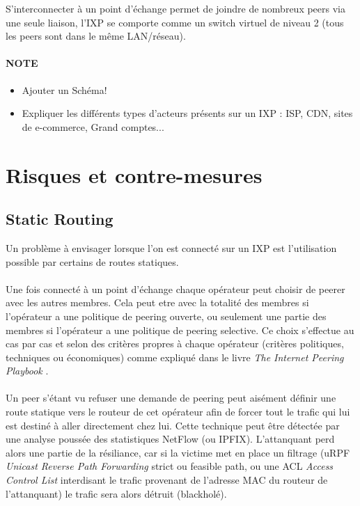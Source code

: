 S'interconnecter à un point d'échange permet de joindre de nombreux peers via une seule liaison, l'IXP se comporte comme un switch virtuel de niveau 2 (tous les peers sont dans le même LAN/réseau).

\paragraph{NOTE}
\begin{itemize}
\item Ajouter un Schéma!
\item Expliquer les différents types d'acteurs présents sur un IXP : ISP, CDN, sites de e-commerce, Grand comptes...
\end{itemize}

\section{Risques et contre-mesures}

\subsection{Static Routing}
Un problème à envisager lorsque l'on est connecté sur un IXP est l’utilisation possible par certains de routes statiques. 

\paragraph{}
Une fois connecté à un point d'échange chaque opérateur peut choisir de peerer avec les autres membres. Cela peut etre avec la totalité des membres si l'opérateur a une politique de peering ouverte, ou seulement une partie des membres si l'opérateur a une politique de peering selective. Ce choix s'effectue au cas par cas et selon des critères propres à chaque opérateur (critères politiques, techniques ou économiques) comme expliqué dans le livre \emph{The Internet Peering Playbook} \cite{fenioux:PeeringPlaybook}.

\paragraph{}
Un peer s'étant vu refuser une demande de peering peut aisément définir une route statique vers le routeur de cet opérateur afin de forcer tout le trafic qui lui est destiné à aller directement chez lui. Cette technique peut être détectée par une analyse poussée des statistiques NetFlow (ou IPFIX). L'attanquant perd alors une partie de la résiliance, car si la victime met en place un filtrage (uRPF \emph{Unicast Reverse Path Forwarding} strict ou feasible path, ou une ACL \emph{Access Control List} interdisant le trafic provenant de l'adresse MAC du routeur de l'attanquant) le trafic sera alors détruit (blackholé).


